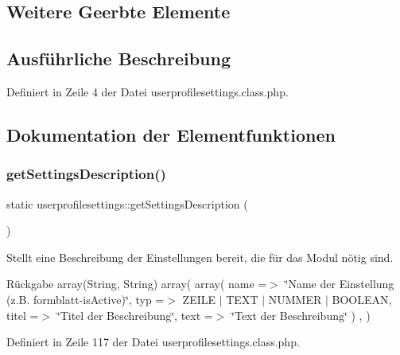 \subsection*{Weitere Geerbte Elemente}


\subsection{Ausführliche Beschreibung}


Definiert in Zeile 4 der Datei userprofilesettings.\+class.\+php.



\subsection{Dokumentation der Elementfunktionen}
\mbox{\label{classuserprofilesettings_a0a6d3f5e6d3d8f6d4e09b2b5ea849756}} 
\subsubsection{\texorpdfstring{get\+Settings\+Description()}{getSettingsDescription()}}
{\footnotesize\ttfamily static userprofilesettings\+::get\+Settings\+Description (\begin{DoxyParamCaption}{ }\end{DoxyParamCaption})\hspace{0.3cm}{\ttfamily [static]}}

Stellt eine Beschreibung der Einstellungen bereit, die für das Modul nötig sind. \begin{DoxyReturn}{Rückgabe}
array(\+String, String) array( array( \textquotesingle{}name\textquotesingle{} =$>$ \char`\"{}\+Name der Einstellung (z.\+B. formblatt-\/is\+Active)\char`\"{}, \textquotesingle{}typ\textquotesingle{} =$>$ Z\+E\+I\+LE $\vert$ T\+E\+XT $\vert$ N\+U\+M\+M\+ER $\vert$ B\+O\+O\+L\+E\+AN, \textquotesingle{}titel\textquotesingle{} =$>$ \char`\"{}\+Titel der Beschreibung\char`\"{}, \textquotesingle{}text\textquotesingle{} =$>$ \char`\"{}\+Text der Beschreibung\char`\"{} ) , ) 
\end{DoxyReturn}


Definiert in Zeile 117 der Datei userprofilesettings.\+class.\+php.

